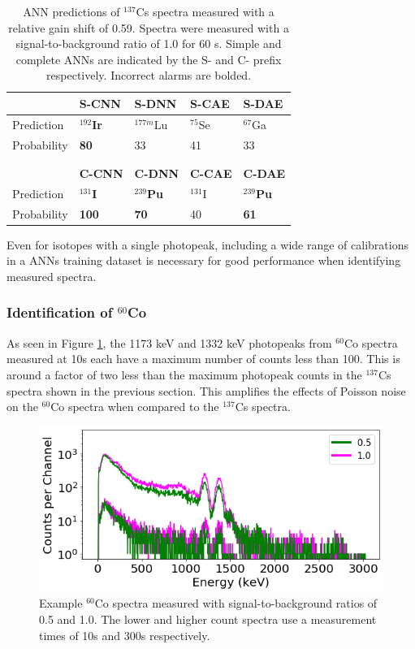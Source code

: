 \begin{table}[H]
	\centering
	\caption{ANN predictions of $^{137}$Cs spectra measured with a relative gain shift of 0.59. Spectra were measured with a signal-to-background ratio of 1.0 for 60 s. Simple and complete ANNs are indicated by the S- and C- prefix respectively. Incorrect alarms are bolded.}
	\label{table:cs137_precictions_60s}
	\begin{tabular}{lllll}
		\hline\
		 & \textbf{S-CNN} & \textbf{S-DNN} & \textbf{S-CAE} & \textbf{S-DAE} \\ \hline
		Prediction & \textbf{$^{192}$Ir} & $^{177m}$Lu &  $^{75}$Se  & $^{67}$Ga \\
		Probability & \textbf{80} & 33 & 41 & 33 \\ \hline \\ \\
		
		\hline
		& \textbf{C-CNN} & \textbf{C-DNN} & \textbf{C-CAE} & \textbf{C-DAE} \\ \hline
		Prediction  & \textbf{$^{131}$I} & \textbf{$^{239}$Pu} & $^{131}$I & \textbf{$^{239}$Pu}  \\ 
		Probability & \textbf{100} & \textbf{70} & 40 & \textbf{61} \\ \hline
	\end{tabular}
\end{table}


Even for isotopes with a single photopeak, including a wide range of calibrations in a ANNs training dataset is necessary for good performance when identifying measured spectra.


\subsubsection{Identification of $^{60}$Co}

As seen in Figure \ref{fig:realspectra-cal-co60-spec}, the 1173 keV and 1332 keV photopeaks from $^{60}$Co spectra measured at 10s each have a maximum number of counts less than 100. This is around a factor of two less than the maximum photopeak counts in the $^{137}$Cs spectra shown in the previous section. This amplifies the effects of Poisson noise on the $^{60}$Co spectra when compared to the $^{137}$Cs spectra.

\begin{figure}[H]
	\centering
	\includegraphics[width=0.85\linewidth]{images/realspectra-cal-co60-spec}
	\caption{Example $^{60}$Co spectra measured with signal-to-background ratios of 0.5 and 1.0. The lower and higher count spectra use a measurement times of 10s and 300s respectively.}
	\label{fig:realspectra-cal-co60-spec}
\end{figure}

